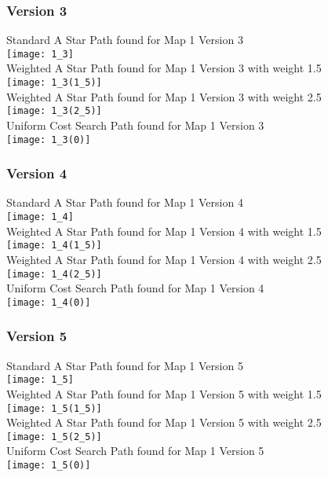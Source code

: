 \documentclass[11pt, oneside]{article}   	%
\begin{document}
\subsubsection{Version 3}
Standard A Star Path found for Map 1 Version 3
\\
\texttt{[image: 1\_3]}
\\
Weighted A Star Path found for Map 1 Version 3 with weight 1.5
\\
\texttt{[image: 1\_3(1\_5)]}
\\
Weighted A Star Path found for Map 1 Version 3 with weight 2.5
\\
\texttt{[image: 1\_3(2\_5)]}
\\
Uniform Cost Search Path found for Map 1 Version 3
\\
\texttt{[image: 1\_3(0)]}
\\
\subsubsection{Version 4}
Standard A Star Path found for Map 1 Version 4
\\
\texttt{[image: 1\_4]}
\\
Weighted A Star Path found for Map 1 Version 4 with weight 1.5
\\
\texttt{[image: 1\_4(1\_5)]}
\\
Weighted A Star Path found for Map 1 Version 4 with weight 2.5
\\
\texttt{[image: 1\_4(2\_5)]}
\\
Uniform Cost Search Path found for Map 1 Version 4
\\
\texttt{[image: 1\_4(0)]}
\\
\subsubsection{Version 5}
Standard A Star Path found for Map 1 Version 5
\\
\texttt{[image: 1\_5]}
\\
Weighted A Star Path found for Map 1 Version 5 with weight 1.5
\\
\texttt{[image: 1\_5(1\_5)]}
\\
Weighted A Star Path found for Map 1 Version 5 with weight 2.5
\\
\texttt{[image: 1\_5(2\_5)]}
\\
Uniform Cost Search Path found for Map 1 Version 5
\\
\texttt{[image: 1\_5(0)]}
\\
\end{document}
